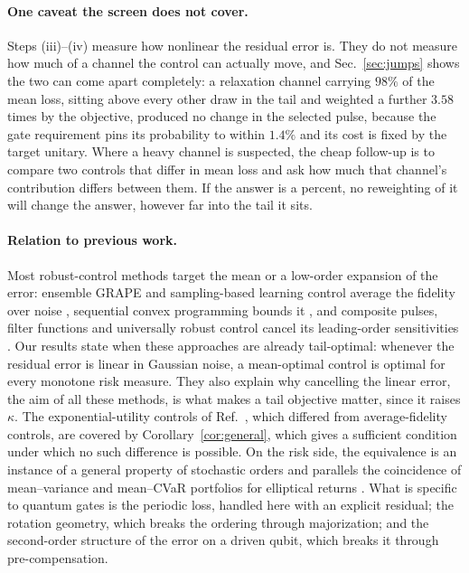 \documentclass[aps,pra,twocolumn,superscriptaddress,reprint,nofootinbib,floatfix]{revtex4-2}
\theoremstyle{definition}
\begin{document}
\paragraph*{One caveat the screen does not cover.} Steps (iii)--(iv) measure
how nonlinear the residual error is. They do not measure how much of a channel
the control can actually move, and Sec.~\ref{sec:jumps} shows the two can come
apart completely: a relaxation channel carrying $98\%$ of the mean loss, sitting
above every other draw in the tail and weighted a further $3.58$ times by the
objective, produced no change in the selected pulse, because the gate
requirement pins its probability to within $1.4\%$ and its cost is fixed by the
target unitary. Where a heavy channel is suspected, the cheap follow-up is to
compare two controls that differ in mean loss and ask how much that channel's
contribution differs between them. If the answer is a percent, no reweighting
of it will change the answer, however far into the tail it sits.

\paragraph*{Relation to previous work.} Most robust-control methods target the
mean or a low-order expansion of the error: ensemble GRAPE and
sampling-based learning control average the fidelity over noise
\cite{Khaneja2005,Glaser2015,Chen2014}, sequential convex programming
bounds it \cite{Kosut2013}, and composite pulses, filter functions and
universally robust control cancel its leading-order sensitivities
\cite{Wimperis1994,Green2013,Poggi2024}. Our results state when these
approaches are already tail-optimal: whenever the residual error is linear
in Gaussian noise, a mean-optimal control is optimal for every monotone risk
measure. They also explain why cancelling the linear error, the aim of all
these methods, is what makes a tail objective matter, since it raises
$\kappa$. The exponential-utility controls of Ref.~\cite{Ge2021}, which
differed from average-fidelity controls, are covered by
Corollary~\ref{cor:general}, which gives a sufficient condition under which no
such difference is possible. On the risk side, the equivalence is an
instance of a general property of stochastic orders
\cite{Shaked2007,Follmer2016} and parallels the coincidence of mean--variance
and mean--CVaR portfolios for elliptical returns
\cite{Rockafellar2000,Embrechts2002}. What is specific to quantum gates is
the periodic loss, handled here with an explicit residual; the rotation
geometry, which breaks the ordering through majorization; and the
second-order structure of the error on a driven qubit, which breaks it
through pre-compensation.
\end{document}
